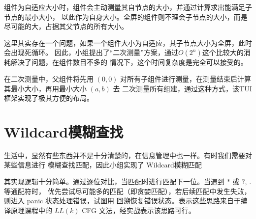 \documentclass{ctexrep}
\begin{document}
组件为自适应大小时，组件会主动测量其自节点的大小，并通过计算求出能满足子节点的最小大小，
以此作为自身大小。全屏的组件则不理会子节点的大小，而是尽可能的大，占据其父节点的所有大小。

这里其实存在一个问题，如果一个组件大小为自适应，其子节点大小为全屏，此时会出现死循环。
因此，小组提出了“二次测量”方案，通过$O(2^n)$这个比较大的消耗解决了问题，在组件数目不多的
情况下，这个时间复杂度是完全可以接受的。

在二次测量中，父组件将先用 $(0,0)$ 对所有子组件进行测量，在测量结束后计算其最小大小，再用最小大小 $(a,b)$ 去
二次测量所有组建，通过这种方式，该TUI框架实现了极其方便的布局。

\section{Wildcard模糊查找}
生活中，显然有些东西并不是十分清楚的，在信息管理中也一样。有时我们需要对某些信息进行
模糊查找匹配，因此小组实现了 Wildcard模糊匹配


其实现逻辑十分简单。通过逐位对比，当匹配时进行匹配下一位。当遇到 $*$ 或 $?$, $.$ 等通配符时，
优先尝试尽可能多的匹配（即贪婪匹配），若后续匹配中发生失败，则进入 panic 状态处理错误，试图用
回溯恢复错误状态。表示这些思路来自于编译原理课程中的 $LL(k)$ CFG 文法，经实战表示该思路可行。
\end{document}
